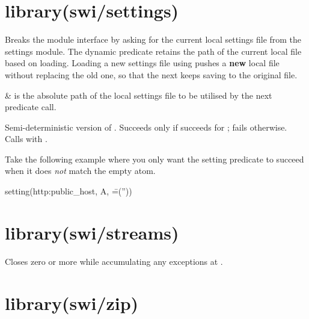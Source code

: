 \chapter{library(swi/settings)}\label{sec:settings}

\begin{description}
Breaks the module interface by asking for the current local settings
file from the settings module. The  dynamic predicate
retains the path of the current local file based on loading. Loading
a new settings file using  pushes a \textbf{new} local
file without replacing the old one, so that the next 
keeps saving to the original file.

\begin{arguments}
 & is the absolute path of the local settings file to be
utilised by the next  predicate call. \\
\end{arguments}

Semi-deterministic version of . Succeeds only if 
succeeds for ; fails otherwise. Calls  with .

Take the following example where you only want the setting
predicate to succeed when it does \textit{not} match the empty atom.

\begin{code}
setting(http:public_host, A, \==(''))
\end{code}

\end{description}

\chapter{library(swi/streams)}\label{sec:streams}

\begin{description}
Closes zero or more  while accumulating any exceptions at
.
\end{description}

\chapter{library(swi/zip)}\label{sec:zip}

